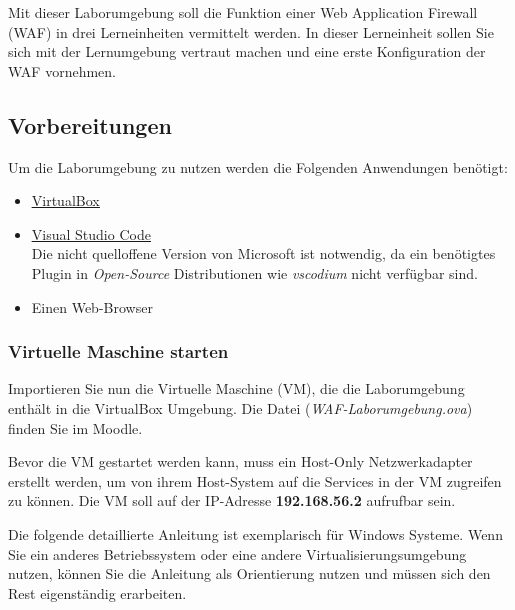 Mit dieser Laborumgebung soll die Funktion einer Web Application Firewall (WAF) in drei Lerneinheiten vermittelt werden.
In dieser Lerneinheit sollen Sie sich mit der Lernumgebung vertraut machen und eine erste Konfiguration der WAF vornehmen.

\subsection{Vorbereitungen}
\label{sec:learning-unit-1-preparations}

Um die Laborumgebung zu nutzen werden die Folgenden Anwendungen benötigt:
\begin{itemize}
    \item \href{https://www.virtualbox.org/}{\underline{VirtualBox}}
    \item \href{https://code.visualstudio.com/download}{\underline{Visual Studio Code}}\\
    Die nicht quelloffene Version von Microsoft ist notwendig, da ein benötigtes Plugin in \textit{Open-Source} Distributionen wie \textit{vscodium} nicht verfügbar sind.
    \item Einen Web-Browser
\end{itemize}

\subsubsection{Virtuelle Maschine starten}
Importieren Sie nun die Virtuelle Maschine (VM),  die die Laborumgebung enthält in die VirtualBox Umgebung.
Die Datei (\textit{WAF-Laborumgebung.ova}) finden Sie im Moodle.

Bevor die VM gestartet werden kann, muss ein Host-Only Netzwerkadapter erstellt werden, um von ihrem Host-System auf die Services in der VM zugreifen zu können.
Die VM soll auf der IP-Adresse \textbf{192.168.56.2} aufrufbar sein.

Die folgende detaillierte Anleitung ist exemplarisch für Windows Systeme.
Wenn Sie ein anderes Betriebssystem oder eine andere Virtualisierungsumgebung nutzen, können Sie die Anleitung als Orientierung nutzen und müssen sich den Rest eigenständig erarbeiten.


